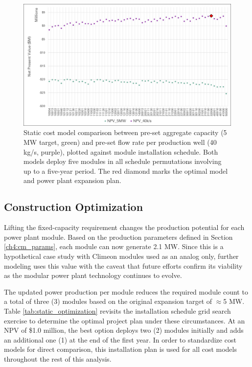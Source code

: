\begin{figure}[!htp]
\centering
\includegraphics[width=.98\textwidth]
{templates/images/Figure-Static_Model_Construction.png}
\caption[Static cost model comparison]{Static cost model comparison between pre-set aggregate capacity (5 MW target, green) and pre-set flow rate per production well (40 kg/s, purple), plotted against module installation schedule. Both models deploy five modules in all schedule permutations involving up to a five-year period. The red diamond marks the optimal model and power plant expansion plan.}
\label{fig:static_model_compare}
\end{figure}

\subsection{Construction Optimization}
\label{ch6:static_schedule}

Lifting the fixed-capacity requirement changes the production potential for each power plant module. Based on the production parameters defined in Section \ref{ch4:cm_params}, each module can now generate 2.1 MW. Since this is a hypothetical case study with Climeon modules used as an analog only, further modeling uses this value with the caveat that future efforts confirm its viability as the modular power plant technology continues to evolve.

The updated power production per module reduces the required module count to a total of three (3) modules based on the original expansion target of $\approx$5 MW. Table \ref{tab:static_optimization} revisits the installation schedule grid search exercise to determine the optimal project plan under these circumstances. At an NPV of \$1.0 million, the best option deploys two (2) modules initially and adds an additional one (1) at the end of the first year. In order to standardize cost models for direct comparison, this installation plan is used for all cost models throughout the rest of this analysis.

